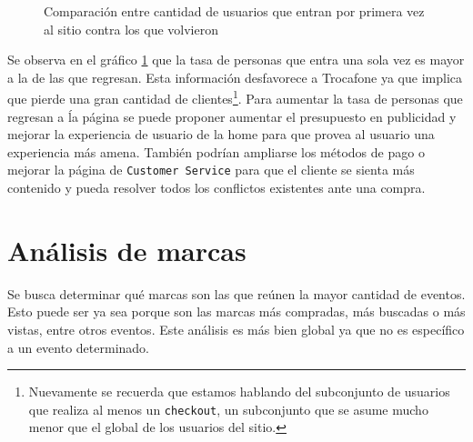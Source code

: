 \documentclass[a4paper]{article}
\begin{document}
\begin{figure}[h!]
	\caption{Comparación entre cantidad de usuarios que entran por primera vez al sitio contra los que volvieron}
	\label{fig:newvsreturning}
\end{figure}

Se observa en el gráfico \ref{fig:newvsreturning} que la tasa de personas que entra una sola vez es mayor a la de las que regresan. Esta información desfavorece a Trocafone ya que implica que pierde una gran cantidad de clientes\footnote{Nuevamente se recuerda que estamos hablando del subconjunto de usuarios que realiza al menos un \texttt{checkout}, un subconjunto que se asume mucho menor que el global de los usuarios del sitio.}. Para aumentar la tasa de personas que regresan a ĺa página se puede proponer aumentar el presupuesto en publicidad y mejorar la experiencia de usuario de la home para que provea al usuario una experiencia más amena. También podrían ampliarse los métodos de pago o mejorar la página de \texttt{Customer Service} para que el cliente se sienta más contenido y pueda resolver todos los conflictos existentes ante una compra.

\section{Análisis de marcas}

Se busca determinar qué marcas son las que reúnen la mayor cantidad de eventos. Esto puede ser ya sea porque son las marcas más compradas, más buscadas o más vistas, entre otros eventos. Este análisis es más bien global ya que no es específico a un evento determinado.
\end{document}
